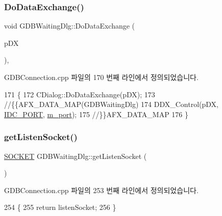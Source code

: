\subsubsection{\texorpdfstring{Do\+Data\+Exchange()}{DoDataExchange()}}
{\footnotesize\ttfamily void G\+D\+B\+Waiting\+Dlg\+::\+Do\+Data\+Exchange (\begin{DoxyParamCaption}\item[{C\+Data\+Exchange $\ast$}]{p\+DX }\end{DoxyParamCaption})\hspace{0.3cm}{\ttfamily [protected]}, {\ttfamily [virtual]}}



G\+D\+B\+Connection.\+cpp 파일의 170 번째 라인에서 정의되었습니다.


\begin{DoxyCode}
171 \{
172   CDialog::DoDataExchange(pDX);
173   \textcolor{comment}{//\{\{AFX\_DATA\_MAP(GDBWaitingDlg)}
174   DDX\_Control(pDX, \mbox{\hyperlink{resource_8h_a574f1300495ff98df6df2d9fa6aee8c3}{IDC\_PORT}}, \mbox{\hyperlink{class_g_d_b_waiting_dlg_a3acb8dcd210dc9bb20df25b0ebb6dc4e}{m\_port}});
175   \textcolor{comment}{//\}\}AFX\_DATA\_MAP}
176 \}
\end{DoxyCode}
\mbox{\label{class_g_d_b_waiting_dlg_ab5fef2284ac8d9ea1b93f05dc4832438}} 
\subsubsection{\texorpdfstring{get\+Listen\+Socket()}{getListenSocket()}}
{\footnotesize\ttfamily \mbox{\hyperlink{remote_8cpp_aff55fe551a9992a54ec54621c524d0a4}{S\+O\+C\+K\+ET}} G\+D\+B\+Waiting\+Dlg\+::get\+Listen\+Socket (\begin{DoxyParamCaption}{ }\end{DoxyParamCaption})}



G\+D\+B\+Connection.\+cpp 파일의 253 번째 라인에서 정의되었습니다.


\begin{DoxyCode}
254 \{
255   \textcolor{keywordflow}{return} listenSocket;
256 \}
\end{DoxyCode}
\mbox{\label{class_g_d_b_waiting_dlg_a21c7ce6a732f447fbdb277f0c6b596d3}} 
